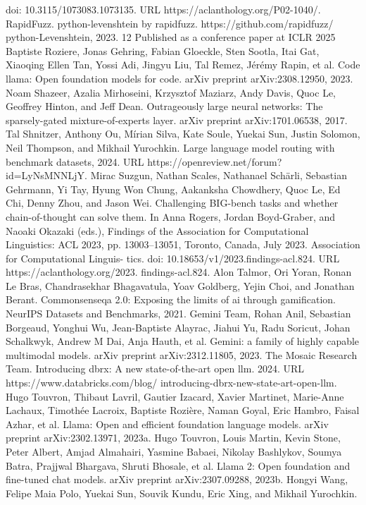 doi: 10.3115/1073083.1073135. URL https://aclanthology.org/P02-1040/.
RapidFuzz.
python-levenshtein by rapidfuzz.
https://github.com/rapidfuzz/
python-Levenshtein, 2023.
12
Published as a conference paper at ICLR 2025
Baptiste Roziere, Jonas Gehring, Fabian Gloeckle, Sten Sootla, Itai Gat, Xiaoqing Ellen Tan, Yossi
Adi, Jingyu Liu, Tal Remez, Jérémy Rapin, et al. Code llama: Open foundation models for code.
arXiv preprint arXiv:2308.12950, 2023.
Noam Shazeer, Azalia Mirhoseini, Krzysztof Maziarz, Andy Davis, Quoc Le, Geoffrey Hinton, and
Jeff Dean. Outrageously large neural networks: The sparsely-gated mixture-of-experts layer. arXiv
preprint arXiv:1701.06538, 2017.
Tal Shnitzer, Anthony Ou, Mírian Silva, Kate Soule, Yuekai Sun, Justin Solomon, Neil Thompson,
and Mikhail Yurochkin. Large language model routing with benchmark datasets, 2024. URL
https://openreview.net/forum?id=LyNsMNNLjY.
Mirac Suzgun, Nathan Scales, Nathanael Schärli, Sebastian Gehrmann, Yi Tay, Hyung Won Chung,
Aakanksha Chowdhery, Quoc Le, Ed Chi, Denny Zhou, and Jason Wei. Challenging BIG-bench
tasks and whether chain-of-thought can solve them.
In Anna Rogers, Jordan Boyd-Graber,
and Naoaki Okazaki (eds.), Findings of the Association for Computational Linguistics: ACL
2023, pp. 13003–13051, Toronto, Canada, July 2023. Association for Computational Linguis-
tics. doi: 10.18653/v1/2023.findings-acl.824. URL https://aclanthology.org/2023.
findings-acl.824.
Alon Talmor, Ori Yoran, Ronan Le Bras, Chandrasekhar Bhagavatula, Yoav Goldberg, Yejin Choi, and
Jonathan Berant. Commonsenseqa 2.0: Exposing the limits of ai through gamification. NeurIPS
Datasets and Benchmarks, 2021.
Gemini Team, Rohan Anil, Sebastian Borgeaud, Yonghui Wu, Jean-Baptiste Alayrac, Jiahui Yu, Radu
Soricut, Johan Schalkwyk, Andrew M Dai, Anja Hauth, et al. Gemini: a family of highly capable
multimodal models. arXiv preprint arXiv:2312.11805, 2023.
The
Mosaic
Research
Team.
Introducing
dbrx:
A
new
state-of-the-art
open
llm.
2024.
URL
https://www.databricks.com/blog/
introducing-dbrx-new-state-art-open-llm.
Hugo Touvron, Thibaut Lavril, Gautier Izacard, Xavier Martinet, Marie-Anne Lachaux, Timothée
Lacroix, Baptiste Rozière, Naman Goyal, Eric Hambro, Faisal Azhar, et al. Llama: Open and
efficient foundation language models. arXiv preprint arXiv:2302.13971, 2023a.
Hugo Touvron, Louis Martin, Kevin Stone, Peter Albert, Amjad Almahairi, Yasmine Babaei, Nikolay
Bashlykov, Soumya Batra, Prajjwal Bhargava, Shruti Bhosale, et al. Llama 2: Open foundation
and fine-tuned chat models. arXiv preprint arXiv:2307.09288, 2023b.
Hongyi Wang, Felipe Maia Polo, Yuekai Sun, Souvik Kundu, Eric Xing, and Mikhail Yurochkin.
